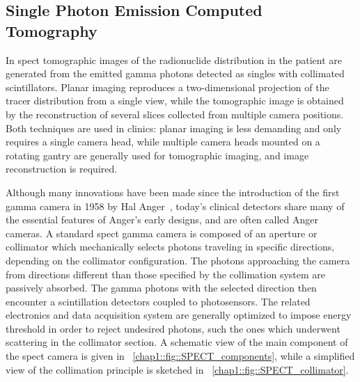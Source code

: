 \subsection{Single Photon Emission Computed Tomography}\label{chap1::subsec::SPECT_NM}
In \gls{spect} tomographic images of the radionuclide distribution in the patient are generated from the emitted gamma photons detected as singles with collimated scintillators. Planar imaging reproduces a two-dimensional projection of the tracer distribution from a single view, while the tomographic image is obtained by the reconstruction of several slices collected from multiple camera positions. Both techniques are used in clinics: planar imaging is less demanding and only requires a single camera head, while multiple camera heads mounted on a rotating gantry are generally used for tomographic imaging, and image reconstruction is required.

Although many innovations have been made since the introduction of the first gamma camera in 1958 by Hal Anger~\parencite{Anger1958}, today's clinical detectors share many of the essential features of Anger's early designs, and are often called Anger cameras. A standard \gls{spect} gamma camera is composed of an aperture or collimator which mechanically selects photons traveling in specific directions, depending on the collimator configuration. The photons approaching the camera from directions different than those specified by the collimation system are passively absorbed. The gamma photons with the selected direction then encounter a scintillation detectors coupled to photosensors. The related electronics and data acquisition system are generally optimized to impose energy threshold in order to reject undesired photons, such the ones which underwent scattering in the collimator section. A schematic view of the main component of the \gls{spect} camera is given in \figurename~\ref{chap1::fig::SPECT_components}, while a simplified view of the collimation principle is sketched in \figurename~\ref{chap1::fig::SPECT_collimator}.   

